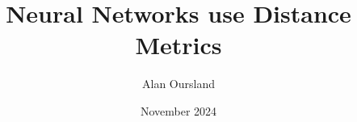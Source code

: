 \documentclass[11pt]{article}
\title{Neural Networks use Distance Metrics}
\author{Alan Oursland}
\affil{\textit{alan.oursland@gmail.com}}
\date{November 2024}
\begin{document}
\maketitle

\begin{abstract}

\end{abstract}












\appendix

% 

% 
\end{document}
